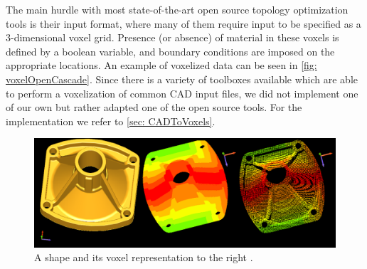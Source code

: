 

The main hurdle with most state-of-the-art open source topology optimization tools is their input format, where many of them require input to be specified as a 3-dimensional voxel grid. Presence (or absence) of material in these voxels is defined by a boolean variable, and boundary conditions are imposed on the appropriate locations. An example of voxelized data can be seen in \autoref{fig: voxelOpenCascade}. Since there is a variety of toolboxes available which are able to perform a voxelization of common CAD input files, we did not implement one of our own but rather adapted one of the open source tools. For the implementation we refer to \autoref{sec: CADToVoxels}. %
\begin{figure}
\centering
  \includegraphics[scale=0.3]{Pictures/CADToVoxel/voxels_wp_image005.png}
\caption{A shape and its voxel representation to the right \cite{OpenCascade}.}
\label{fig: voxelOpenCascade}
\end{figure}

 